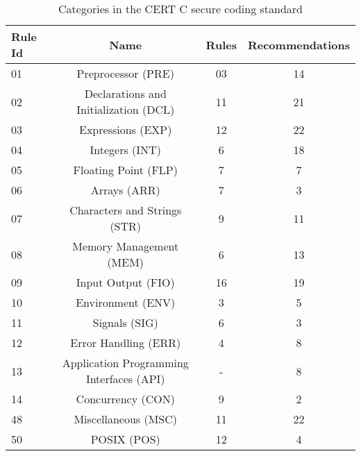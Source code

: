 \begin{table}[h!]
	\centering
	
	\label{tab:table2}
 
	\begin{tabular}{|l|c|c|c|}
		\hline
		\textbf{Rule Id} & \textbf{Name} & \textbf{Rules} & \textbf{Recommendations}\\
		
		\hline
		01 & Preprocessor (PRE) & 03 & 14\\
		\hline
		
		02 & Declarations and Initialization (DCL) & 11 & 21\\
		\hline
		
		03 & Expressions (EXP) & 12 & 22\\
		\hline
		
		04 & Integers (INT) & 6 & 18\\
		\hline
		
		05 & Floating Point (FLP) & 7 & 7\\
		\hline
		
		06 & Arrays (ARR) & 7 & 3\\
		\hline
		
		07 & Characters and Strings (STR) & 9 & 11\\
		\hline
		
		08 & Memory Management (MEM) & 6 & 13\\
		\hline
		
		09 & Input Output (FIO) & 16 & 19\\
		\hline
		
		10 & Environment (ENV) & 3 & 5\\
		\hline
		
		11 & Signals (SIG) & 6 & 3\\
		\hline
		
		12 & Error Handling (ERR) & 4 & 8\\
		\hline
		
		13 & Application Programming Interfaces (API) & - & 8\\
		\hline
		
		14 & Concurrency (CON) & 9 & 2\\
		\hline
		
		48 & Miscellaneous (MSC) & 11 & 22\\
		\hline
		
		50 & POSIX (POS) & 12 & 4\\
		\hline
		
	\end{tabular}
	\caption{Categories in the CERT C secure coding standard}
\end{table}
\newpage
